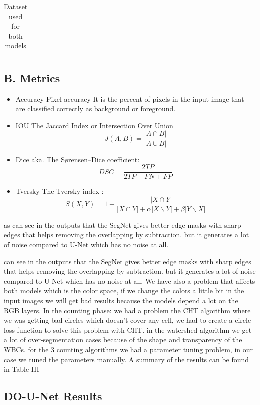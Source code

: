 \documentclass[conference]{IEEEtran}
\begin{document}
\begin{table}[htbp]
\centering
\caption{Dataset used for both models}
\label{tab:II}
\begin{tabular}{lll}
\hline
 & & \\
\hline
\end{tabular}
\end{table}
\subsection{B. Metrics}
\begin{itemize}
\item Accuracy Pixel accuracy It is the percent of pixels in the input image that are classified correctly as background or foreground.
\item IOU The Jaccard Index or Intersection Over Union
\[ J(A, B) = \frac{|A \cap B|}{|A \cup B|} \]
\item Dice aka. The Sørensen–Dice coefficient:
\[ DSC = \frac{2TP}{2TP + FN + FP} \]
\item Tversky The Tversky index :
\[ S(X, Y) = 1 - \frac{|X \cap Y|}{|X \cap Y| + \alpha|X\backslash Y| + \beta|Y\backslash X|} \]
\end{itemize}
as can see in the outputs that the SegNet gives better edge masks with sharp edges that helps removing the overlapping by subtraction. but it generates a lot of noise compared to U-Net which has no noise at all.

can see in the outputs that the SegNet gives better edge masks with sharp edges that helps removing the overlapping by subtraction. but it generates a lot of noise compared to U-Net which has no noise at all.
We have also a problem that affects both models which is the color space, if we change the colors a little bit in the input images we will get bad results because the models depend a lot on the RGB layers.
In the counting phase: we had a problem the CHT algorithm where we was getting bad circles which doesn’t cover any cell, we had to create a circle loss function to solve this problem with CHT. in the watershed algorithm we get a lot of over-segmentation cases because of the shape and transparency of the WBCs. for the 3 counting algorithms we had a parameter tuning problem, in our case we tuned the parameters manually. A summary of the results can be found in Table III
\subsection{DO-U-Net Results}
\end{document}

